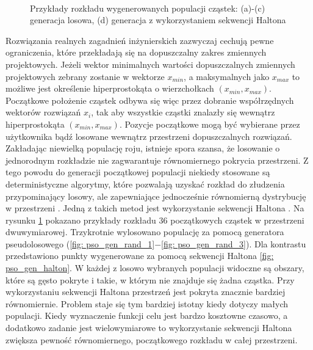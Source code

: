 \begin{figure}[hbt!]
	\centering
	\\
	\captionsetup{justification=centering}
	\caption{Przykłady rozkładu wygenerowanych populacji cząstek: (a)-(c) generacja losowa, (d) generacja z wykorzystaniem sekwencji Haltona}
	\label{fig: pso_gen_expl}
\end{figure}

Rozwiązania realnych zagadnień inżynierskich zazwyczaj cechują pewne ograniczenia, które przekładają się na dopuszczalny zakres zmiennych projektowych. Jeżeli wektor minimalnych wartości dopuszczalnych zmiennych projektowych zebrany zostanie w wektorze $x_{min}$, a maksymalnych jako $x_{max}$ to możliwe jest określenie hiperprostokąta o wierzchołkach $(x_{min},x_{max})$. Początkowe położenie cząstek odbywa się więc przez dobranie współrzędnych wektorów rozwiązań $x_i$, tak aby wszystkie cząstki znalazły się wewnątrz hiperprostokąta $(x_{min},x_{max})$. Pozycje początkowe mogą być wybierane przez użytkownika bądź losowane wewnątrz przestrzeni dopuszczalnych rozwiązań. Zakładając niewielką populację roju, istnieje spora szansa, że losowanie o jednorodnym rozkładzie nie zagwarantuje równomiernego pokrycia przestrzeni. Z tego powodu do generacji początkowej populacji niekiedy stosowane są deterministyczne algorytmy, które pozwalają uzyskać rozkład do złudzenia przypominający losowy, ale zapewniające jednocześnie równomierną dystrybucję w przestrzeni \parencite{Saliby2002}. Jedną z takich metod jest wykorzystanie sekwencji Haltona \parencite{Tesch2016}. Na rysunku \ref{fig: pso_gen_expl} pokazano przykłady rozkładu 36 początkowych cząstek w przestrzeni dwuwymiarowej. Trzykrotnie wylosowano populację za pomocą generatora pseudolosowego (\ref{fig: pso_gen_rand_1}$-$\ref{fig: pso_gen_rand_3}). Dla kontrastu przedstawiono punkty wygenerowane za pomocą sekwencji Haltona \ref{fig: pso_gen_halton}. W każdej z losowo wybranych populacji widoczne są obszary, które są gęsto pokryte i takie, w którym nie znajduje się żadna cząstka. Przy wykorzystaniu sekwencji Haltona przestrzeń jest pokryta znacznie bardziej równomiernie. Problem staje się tym bardziej istotny kiedy dotyczy małych populacji. Kiedy wyznaczenie funkcji celu jest bardzo kosztowne czasowo, a dodatkowo zadanie jest wielowymiarowe to wykorzystanie sekwencji Haltona zwiększa pewność równomiernego, początkowego rozkładu w całej przestrzeni.

